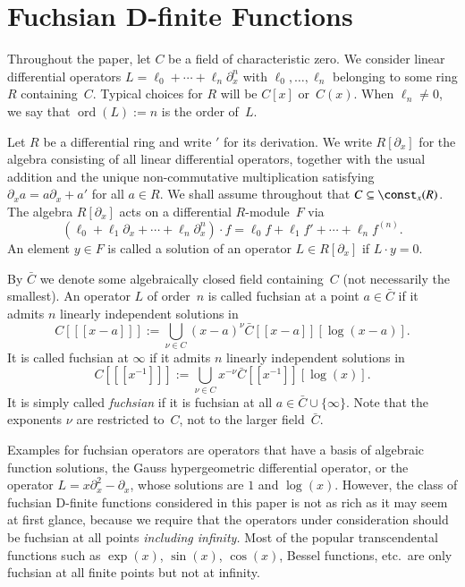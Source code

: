 \documentclass[final,1p,times,authoryear]{elsarticle}
\def\ord{\operatorname{ord}}
\begin{document}
\section{Fuchsian D-finite Functions}

Throughout the paper, let $C$ be a field of characteristic zero. We consider linear differential operators
$L=\ell_0+\cdots+\ell_n\partial_x^n$ with $\ell_0,\dots,\ell_n$ belonging to some ring
$R$ containing~$C$. Typical choices for $R$ will be $C[x]$ or~$C(x)$.
When $\ell_n\neq0$, we say that $\ord(L):=n$ is the order of~$L$.

Let $R$ be a differential ring and write $'$ for its derivation.
We write $R[\partial_x]$ for the algebra consisting of all linear differential operators, together
with the usual addition and the unique non-commutative multiplication satisfying
$\partial_xa=a\partial_x+a'$ for all $a\in R$. We shall assume throughout that $C\subseteq\const_x(R)$.
The algebra $R[\partial_x]$ acts on a differential $R$-module~$F$ via
\[
  (\ell_0+\ell_1\partial_x+\cdots+\ell_n\partial_x^n)\cdot f=
   \ell_0f + \ell_1f' + \cdots + \ell_n f^{(n)}.
\]
An element $y\in F$ is called a solution of an operator $L\in R[\partial_x]$ if
$L\cdot y=0$.

By $\bar C$ we denote some algebraically closed field containing~$C$ (not necessarily the smallest).
An operator $L$ of order~$n$ is called fuchsian at a point $a\in\bar C$ if
it admits $n$ linearly independent solutions in
\[
  C[[[x-a]]] := \bigcup_{\nu\in C} (x-a)^\nu\bar C[[x-a]][\log(x-a)].
\]
It is called fuchsian at $\infty$ if it admits $n$ linearly independent solutions in
\[
  C[[[x^{-1}]]] := \bigcup_{\nu\in C} x^{-\nu} \bar C[[x^{-1}]][\log(x)].
\]
It is simply called \emph{fuchsian} if it is fuchsian at all $a\in\bar C\cup\{\infty\}$.
Note that the exponents $\nu$ are restricted to~$C$, not to the larger field~$\bar C$.

Examples for fuchsian operators are operators that have a basis of algebraic
function solutions, the Gauss hypergeometric differential operator, or the
operator $L=x\partial_x^2-\partial_x$, whose solutions are $1$ and $\log(x)$.
However, the class of fuchsian D-finite functions
considered in this paper is not as rich as it may seem at first glance, because
we require that the operators under consideration should be fuchsian at all
points \emph{including infinity.} Most of the popular transcendental functions
such as $\exp(x)$, $\sin(x)$, $\cos(x)$, Bessel functions, etc.\ are only
fuchsian at all finite points but not at infinity.
\end{document}
